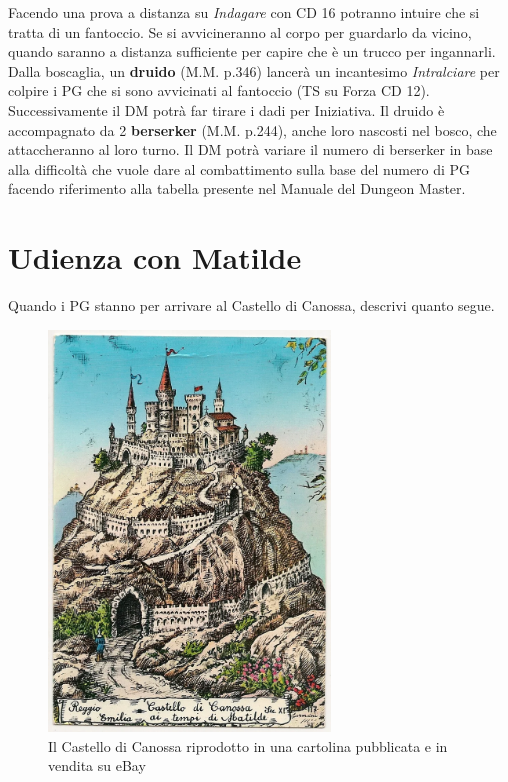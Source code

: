 \documentclass[letterpaper,twocolumn,openany,nodeprecatedcode]{dndbook}
\begin{document}
Facendo una prova a distanza su \textit{Indagare} con CD 16 potranno intuire che si tratta di un fantoccio. Se si avvicineranno al corpo per guardarlo da vicino, quando saranno a distanza sufficiente per capire che è un trucco per ingannarli. Dalla boscaglia, un \textbf{druido} (M.M. p.346) lancerà un incantesimo \textit{Intralciare} per colpire i PG che si sono avvicinati al fantoccio (TS su Forza CD 12). Successivamente il DM potrà far tirare i dadi per Iniziativa. Il druido è accompagnato da 2 \textbf{berserker} (M.M. p.244), anche loro nascosti nel bosco, che attaccheranno al loro turno. Il DM potrà variare il numero di berserker in base alla difficoltà che vuole dare al combattimento sulla base del numero di PG facendo riferimento alla tabella presente nel Manuale del Dungeon Master\cite{dnd:dm}.







\section{Udienza con Matilde}
Quando i PG stanno per arrivare al Castello di Canossa, descrivi quanto segue.

\begin{figure}
\centering
\includegraphics[width=7.5cm]{img/castello.png}
\caption{Il Castello di Canossa riprodotto in una cartolina pubblicata e in vendita su eBay}
\label{castello}
\end{figure}
\end{document}
